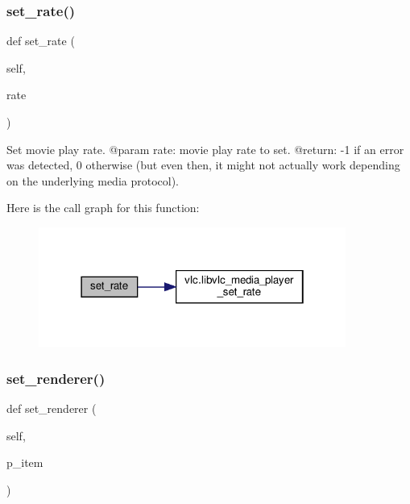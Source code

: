\subsubsection{\texorpdfstring{set\+\_\+rate()}{set\_rate()}}
{\footnotesize\ttfamily def set\+\_\+rate (\begin{DoxyParamCaption}\item[{}]{self,  }\item[{}]{rate }\end{DoxyParamCaption})}

\begin{DoxyVerb}Set movie play rate.
@param rate: movie play rate to set.
@return: -1 if an error was detected, 0 otherwise (but even then, it might not actually work depending on the underlying media protocol).
\end{DoxyVerb}
 Here is the call graph for this function\+:
\nopagebreak
\begin{figure}[H]
\begin{center}
\leavevmode
\includegraphics[width=286pt]{classvlc_1_1_media_player_ad50cf98b830498f40d70c8073683fedf_cgraph}
\end{center}
\end{figure}
\mbox{\label{classvlc_1_1_media_player_ac5e81ce9112a3e7c8ac0eecfc5334972}} 
\subsubsection{\texorpdfstring{set\+\_\+renderer()}{set\_renderer()}}
{\footnotesize\ttfamily def set\+\_\+renderer (\begin{DoxyParamCaption}\item[{}]{self,  }\item[{}]{p\+\_\+item }\end{DoxyParamCaption})}

